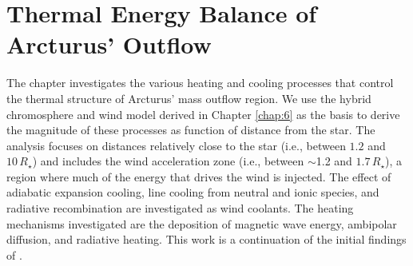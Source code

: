 \chapter{Thermal Energy Balance of Arcturus' Outflow}
\label{chap:7}

The chapter investigates the various heating and cooling processes that control the thermal structure of Arcturus' mass outflow region. We use the hybrid chromosphere and wind model derived in Chapter \ref{chap:6} as the basis to derive the magnitude of these processes as function of distance from the star. The analysis focuses on distances relatively close to the star (i.e., between $1.2$ and $10\,R_{\star}$) and includes the wind acceleration zone (i.e., between $\sim$1.2 and $1.7\,R_{\star}$), a region where much of the energy that drives the wind is injected. The effect of adiabatic expansion cooling, line cooling from neutral and ionic species, and radiative recombination are investigated as wind coolants. The heating mechanisms investigated are the deposition of magnetic wave energy, ambipolar diffusion, and radiative heating. This work is a continuation of the initial findings of \cite{ogorman_2011}.

\pagebreak


